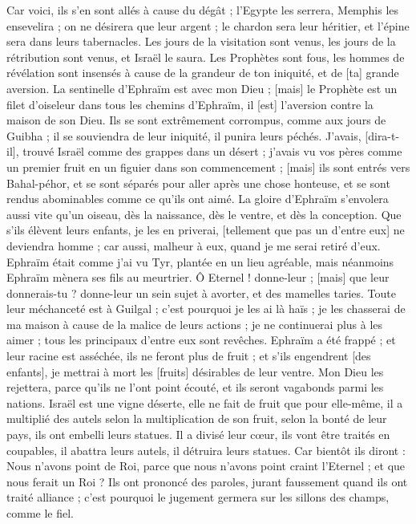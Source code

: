 \begin{multicols}{2}
Car voici, ils s'en sont allés à cause du dégât ; l'Egypte les serrera, Memphis les ensevelira ; on ne désirera que leur argent ; le chardon sera leur héritier, et l'épine sera dans leurs tabernacles.
Les jours de la visitation sont venus, les jours de la rétribution sont venus, et Israël le saura. Les Prophètes sont fous, les hommes de révélation sont insensés à cause de la grandeur de ton iniquité, et de [ta] grande aversion.
La sentinelle d'Ephraïm est avec mon Dieu ; [mais] le Prophète est un filet d'oiseleur dans tous les chemins d'Ephraïm, il [est] l'aversion contre la maison de son Dieu.
Ils se sont extrêmement corrompus, comme aux jours de Guibha ; il se souviendra de leur iniquité, il punira leurs péchés.
J'avais, [dira-t-il], trouvé Israël comme des grappes dans un désert ; j'avais vu vos pères comme un premier fruit en un figuier dans son commencement ; [mais] ils sont entrés vers Bahal-péhor, et se sont séparés pour aller après une chose honteuse, et se sont rendus abominables comme ce qu'ils ont aimé.
La gloire d'Ephraïm s'envolera aussi vite qu'un oiseau, dès la naissance, dès le ventre, et dès la conception.
Que s'ils élèvent leurs enfants, je les en priverai, [tellement que pas un d'entre eux] ne deviendra homme ; car aussi, malheur à eux, quand je me serai retiré d'eux.
Ephraïm était comme j'ai vu Tyr, plantée en un lieu agréable, mais néanmoins Ephraïm mènera ses fils au meurtrier.
Ô Eternel ! donne-leur ; [mais] que leur donnerais-tu ? donne-leur un sein sujet à avorter, et des mamelles taries.
Toute leur méchanceté est à Guilgal ; c'est pourquoi je les ai là haïs ; je les chasserai de ma maison à cause de la malice de leurs actions ; je ne continuerai plus à les aimer ; tous les principaux d'entre eux sont revêches.
Ephraïm a été frappé ; et leur racine est asséchée, ils ne feront plus de fruit ; et s'ils engendrent [des enfants], je mettrai à mort les [fruits] désirables de leur ventre.
Mon Dieu les rejettera, parce qu'ils ne l'ont point écouté, et ils seront vagabonds parmi les nations.
\VerseOne{}Israël est une vigne déserte, elle ne fait de fruit que pour elle-même, il a multiplié des autels selon la multiplication de son fruit, selon la bonté de leur pays, ils ont embelli leurs statues.
Il a divisé leur cœur, ils vont être traités en coupables, il abattra leurs autels, il détruira leurs statues.
Car bientôt ils diront : Nous n'avons point de Roi, parce que nous n'avons point craint l'Eternel ; et que nous ferait un Roi ?
Ils ont prononcé des paroles, jurant faussement quand ils ont traité alliance ; c'est pourquoi le jugement germera sur les sillons des champs, comme le fiel.

\end{multicols}
